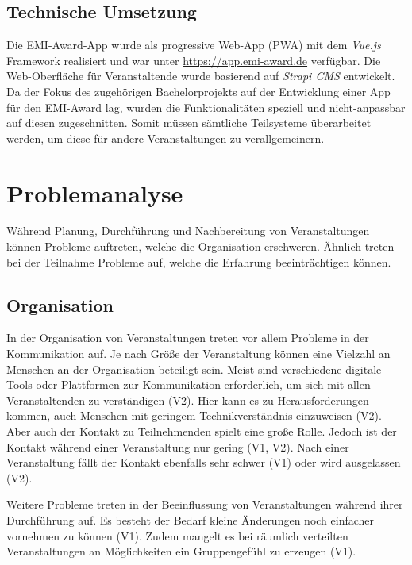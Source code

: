 \subsection{Technische Umsetzung} \label{ssec:analysis-old-tech}

Die EMI-Award-App wurde als progressive Web-App (PWA) mit dem \textit{Vue.js}
Framework realisiert und war unter \url{https://app.emi-award.de} verfügbar. Die
Web-Oberfläche für Veranstaltende wurde basierend auf \textit{Strapi CMS}
entwickelt. Da der Fokus des zugehörigen Bachelorprojekts auf der Entwicklung
einer App für den EMI-Award lag, wurden die Funktionalitäten speziell und
nicht-anpassbar auf diesen zugeschnitten. Somit müssen sämtliche Teilsysteme
überarbeitet werden, um diese für andere Veranstaltungen zu verallgemeinern.


\section{Problemanalyse} \label{sec:analysis-problems}

Während Planung, Durchführung und Nachbereitung von Veranstaltungen können
Probleme auftreten, welche die Organisation erschweren. Ähnlich treten bei der
Teilnahme Probleme auf, welche die Erfahrung beeinträchtigen können.

\subsection{Organisation} \label{ssec:analysis-problems-orga}

In der Organisation von Veranstaltungen treten vor allem Probleme in der
Kommunikation auf. Je nach Größe der Veranstaltung können eine Vielzahl an
Menschen an der Organisation beteiligt sein. Meist sind verschiedene digitale
Tools oder Plattformen zur Kommunikation erforderlich, um sich mit allen
Veranstaltenden zu verständigen (V2). Hier kann es zu Herausforderungen kommen,
auch Menschen mit geringem Technikverständnis einzuweisen (V2). Aber auch der
Kontakt zu Teilnehmenden spielt eine große Rolle. Jedoch ist der Kontakt während
einer Veranstaltung nur gering (V1, V2). Nach einer Veranstaltung fällt der
Kontakt ebenfalls sehr schwer (V1) oder wird ausgelassen (V2).

Weitere Probleme treten in der Beeinflussung von Veranstaltungen während ihrer
Durchführung auf. Es besteht der Bedarf kleine Änderungen noch einfacher
vornehmen zu können (V1). Zudem mangelt es bei räumlich verteilten
Veranstaltungen an Möglichkeiten ein Gruppengefühl zu erzeugen (V1).


